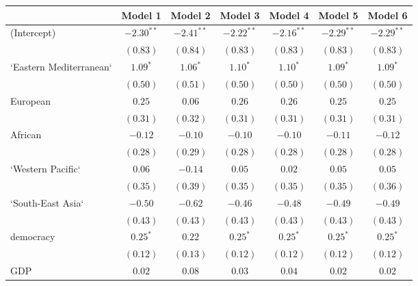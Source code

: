 
\begin{table}[!h]
\begin{center}
\begin{tabular}{l c c c c c c }
\toprule
 & Model 1 & Model 2 & Model 3 & Model 4 & Model 5 & Model 6 \\
\midrule
(Intercept)             & $-2.30^{**}$ & $-2.41^{**}$ & $-2.22^{**}$ & $-2.16^{**}$ & $-2.29^{**}$ & $-2.29^{**}$ \\
                        & $(0.83)$     & $(0.84)$     & $(0.83)$     & $(0.83)$     & $(0.83)$     & $(0.83)$     \\
`Eastern Mediterranean` & $1.09^{*}$   & $1.06^{*}$   & $1.10^{*}$   & $1.10^{*}$   & $1.09^{*}$   & $1.09^{*}$   \\
                        & $(0.50)$     & $(0.51)$     & $(0.50)$     & $(0.50)$     & $(0.50)$     & $(0.50)$     \\
European                & $0.25$       & $0.06$       & $0.26$       & $0.26$       & $0.25$       & $0.25$       \\
                        & $(0.31)$     & $(0.32)$     & $(0.31)$     & $(0.31)$     & $(0.31)$     & $(0.31)$     \\
African                 & $-0.12$      & $-0.10$      & $-0.10$      & $-0.10$      & $-0.11$      & $-0.12$      \\
                        & $(0.28)$     & $(0.29)$     & $(0.28)$     & $(0.28)$     & $(0.28)$     & $(0.28)$     \\
`Western Pacific`       & $0.06$       & $-0.14$      & $0.05$       & $0.02$       & $0.05$       & $0.05$       \\
                        & $(0.35)$     & $(0.39)$     & $(0.35)$     & $(0.35)$     & $(0.35)$     & $(0.36)$     \\
`South-East Asia`       & $-0.50$      & $-0.62$      & $-0.46$      & $-0.48$      & $-0.49$      & $-0.49$      \\
                        & $(0.43)$     & $(0.43)$     & $(0.43)$     & $(0.43)$     & $(0.43)$     & $(0.43)$     \\
democracy               & $0.25^{*}$   & $0.22$       & $0.25^{*}$   & $0.25^{*}$   & $0.25^{*}$   & $0.25^{*}$   \\
                        & $(0.12)$     & $(0.13)$     & $(0.12)$     & $(0.12)$     & $(0.12)$     & $(0.12)$     \\
GDP                     & $0.02$       & $0.08$       & $0.03$       & $0.04$       & $0.02$       & $0.02$       \\

\end{tabular}
\end{center}
\end{table}
